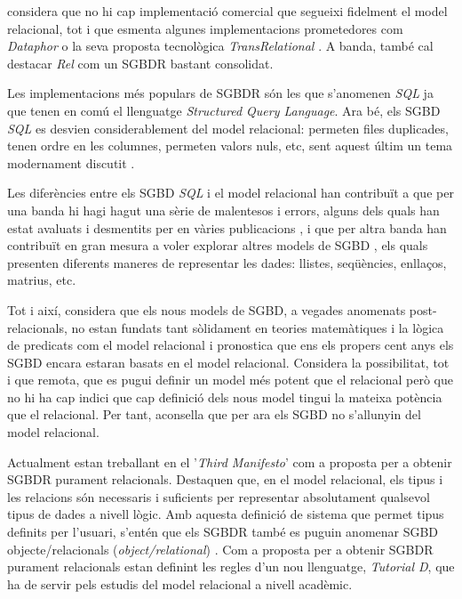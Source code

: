 \textcite[cap.~2]{date06} %
considera que no hi cap implementació comercial que segueixi fidelment
el model relacional, tot i que esmenta algunes implementacions
prometedores com \emph{Dataphor} o la seva proposta tecnològica
\emph{TransRelational} \parencite{date:transrelational}. A banda,
també cal destacar \emph{Rel} \parencite{rel} com un SGBDR bastant
consolidat.

Les implementacions més populars de SGBDR són les que s'anomenen
\emph{SQL} ja que tenen en comú el llenguatge \emph{Structured Query
  Language}. Ara bé, els SGBD \emph{SQL} es desvien considerablement
del model relacional: permeten files duplicades, tenen ordre en les
columnes, permeten valors nuls, etc, sent aquest últim un tema
modernament discutit \parencite{date08:nulls}.

Les diferències entre els SGBD \emph{SQL} i el model relacional han
contribuït a que per una banda hi hagi hagut una sèrie de malentesos i
errors, alguns dels quals han estat avaluats i desmentits per
\citeauthor{dbdebunk} en vàries
publicacions \parencite{dbdebunk,date06}, i que per altra banda han
contribuït en gran mesura a voler explorar altres models de
SGBD \parencite{stonebraker09}, els quals presenten diferents maneres
de representar les dades: llistes, seqüències, enllaços, matrius, etc.

Tot i així, \textcite[cap.~21--25]{date06} considera que els nous
models de SGBD, a vegades anomenats post-relacionals, no estan fundats
tant sòlidament en teories matemàtiques i la lògica de predicats com
el model relacional i pronostica que ens els propers cent anys els
SGBD encara estaran basats en el model
relacional. %
Considera la possibilitat, tot i que remota, que es pugui definir un
model més potent que el relacional però que no hi ha cap indici que
cap definició dels nous model tingui la mateixa potència que el
relacional. Per tant, aconsella que per ara els SGBD no s'allunyin del
model relacional. %

  
Actualment \textcite{date:thethirdmanifesto} estan treballant en el
'\emph{Third Manifesto}' com a proposta per a obtenir SGBDR purament
relacionals. Destaquen que, en el model relacional, els tipus i les
relacions són necessaris i suficients per representar absolutament
qualsevol tipus de dades a nivell lògic. %
Amb aquesta definició de sistema que permet tipus definits per
l'usuari, s'entén que els SGBDR també es puguin anomenar SGBD
objecte/relacionals (\emph{object/relational})
\parencite{date02:foundation}.  Com a proposta per a obtenir SGBDR
purament relacionals
\textcite{date06:_datab_types_relat_model,date:tutoriald} estan
definint les regles d'un nou llenguatge, \emph{Tutorial D}, que ha de
servir pels estudis del model relacional a nivell acadèmic.


